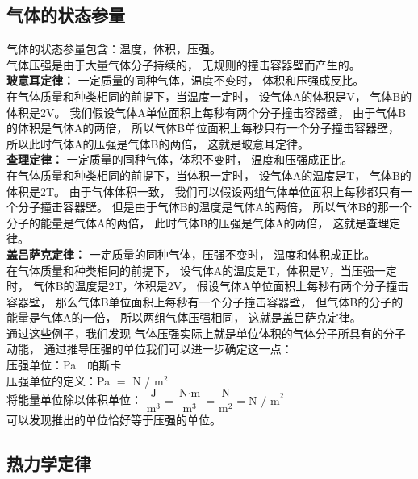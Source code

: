 \documentclass[UTF8]{ctexart}
\begin{document}
\subsection{气体的状态参量}
    气体的状态参量包含：温度，体积，压强。\\[3mm]
    气体压强是由于大量气体分子持续的，
    无规则的撞击容器壁而产生的。\\[6mm]
    \textbf{玻意耳定律：}
    一定质量的同种气体，温度不变时，
    体积和压强成反比。\\[2mm]
    在气体质量和种类相同的前提下，当温度一定时，
    设气体A的体积是V，
    气体B的体积是2V。
    我们假设气体A单位面积上每秒有两个分子撞击容器壁，
    由于气体B的体积是气体A的两倍，
    所以气体B单位面积上每秒只有一个分子撞击容器壁，
    所以此时气体A的压强是气体B的两倍，
    这就是玻意耳定律。\\[6mm]
    \textbf{查理定律：}
    一定质量的同种气体，体积不变时，
    温度和压强成正比。\\[2mm]
    在气体质量和种类相同的前提下，当体积一定时，
    设气体A的温度是T，
    气体B的体积是2T。
    由于气体体积一致，
    我们可以假设两组气体单位面积上每秒都只有一个分子撞击容器壁。
    但是由于气体B的温度是气体A的两倍，
    所以气体B的那一个分子的能量是气体A的两倍，
    此时气体B的压强是气体A的两倍，
    这就是查理定律。\\[6mm]
    \textbf{盖吕萨克定律：}
    一定质量的同种气体，压强不变时，
    温度和体积成正比。\\[2mm]
    在气体质量和种类相同的前提下，
    设气体A的温度是T，体积是V，当压强一定时，
    气体B的温度是2T，体积是2V，
    假设气体A单位面积上每秒有两个分子撞击容器壁，
    那么气体B单位面积上每秒有一个分子撞击容器壁，
    但气体B的分子的能量是气体A的一倍，
    所以两组气体压强相同，
    这就是盖吕萨克定律。\\[6mm]
    通过这些例子，我们发现
    气体压强实际上就是单位体积的气体分子所具有的分子动能，
    通过推导压强的单位我们可以进一步确定这一点：\\[4mm]
    压强单位：Pa~~帕斯卡\\[1mm]
    压强单位的定义：Pa $=$ N / m$^2$\\[4mm]
    将能量单位除以体积单位：
    $\dfrac{\text{J}}{\text{m}^3}=\dfrac{\text{N}\cdot\text{m}}{\text{m}^3}=\dfrac{\text{N}}{\text{m}^2}=\text{N / m}^2$\\[4mm]
    可以发现推出的单位恰好等于压强的单位。

\newpage

\subsection{热力学定律}
\end{document}
